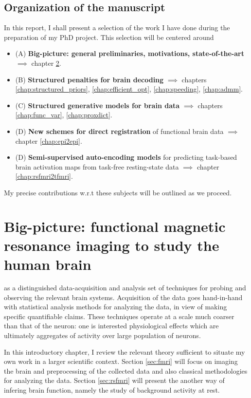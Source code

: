 \section{Organization of the manuscript}
In this report, I shall present a selection of the work I have done during the preparation of my PhD project. This selection will be centered around
\begin{itemize}
\item (A) \textbf{Big-picture: general preliminaries, motivations, state-of-the-art} $\implies$ chapter \ref{chap:bigpic}.
\item (B) \textbf{Structured penalties for brain decoding} $\implies$ chapters \ref{chap:structured_priors}, \ref{chap:efficient_opt}, \ref{chap:speeding}, \ref{chap:admm}.
\item (C) \textbf{Structured generative models for brain data} $\implies$ chapters \ref{chap:func_var}, \ref{chap:proxdict}.
\item (D) \textbf{New schemes for direct registration} of functional brain data $\implies$ chapter \ref{chap:epi2epi}.
\item (D) \textbf{Semi-supervised auto-encoding models} for predicting task-based brain activation
  maps from task-free resting-state data $\implies$ chapter \ref{chap:rsfmri2tfmri}.
\end{itemize}
My precise contributions w.r.t these subjects will be outlined  as we proceed.

\chapter{Big-picture: functional magnetic resonance imaging to study the human brain}\label{chap:bigpic}

\minitoc
 
 as a distinguished data-acquisition and analysis set of techniques for probing and observing the relevant brain systems.
Acquisition of the data goes hand-in-hand with
  statistical analysis methods for analyzing the data, in view of making specific quantifiable claims. These techniques operate at a scale much coarser than that of the neuron: one is interested physiological effects which are ultimately aggregates of activity over large population of neurons.

In this introductory chapter, I review the relevant theory sufficient to situate my own work in a larger scientific context. Section \ref{sec:fmri} will
focus on imaging the brain and preprocessing of the collected data and also classical methodologies for analyzing the data.
  Section \ref{sec:rsfmri} will present the another way of infering brain function,
  namely the study of background activity at rest.


